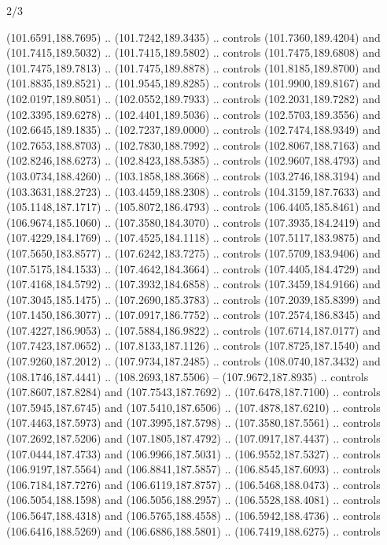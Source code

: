 \begin{flagdescription}{2/3}
\begin{scope}[shift={(0.5\flaglength,0.5)},scale=\flagwidth/320]
\begin{scope}[y=0.8pt, x=0.8pt, yscale=-1,shift={(-118.3,-146)}]
  (101.6591,188.7695) .. (101.7242,189.3435) .. controls (101.7360,189.4204) and
  (101.7415,189.5032) .. (101.7415,189.5802) .. controls (101.7475,189.6808) and
  (101.7475,189.7813) .. (101.7475,189.8878) .. controls (101.8185,189.8700) and
  (101.8835,189.8521) .. (101.9545,189.8285) .. controls (101.9900,189.8167) and
  (102.0197,189.8051) .. (102.0552,189.7933) .. controls (102.2031,189.7282) and
  (102.3395,189.6278) .. (102.4401,189.5036) .. controls (102.5703,189.3556) and
  (102.6645,189.1835) .. (102.7237,189.0000) .. controls (102.7474,188.9349) and
  (102.7653,188.8703) .. (102.7830,188.7992) .. controls (102.8067,188.7163) and
  (102.8246,188.6273) .. (102.8423,188.5385) .. controls (102.9607,188.4793) and
  (103.0734,188.4260) .. (103.1858,188.3668) .. controls (103.2746,188.3194) and
  (103.3631,188.2723) .. (103.4459,188.2308) .. controls (104.3159,187.7633) and
  (105.1148,187.1717) .. (105.8072,186.4793) .. controls (106.4405,185.8461) and
  (106.9674,185.1060) .. (107.3580,184.3070) .. controls (107.3935,184.2419) and
  (107.4229,184.1769) .. (107.4525,184.1118) .. controls (107.5117,183.9875) and
  (107.5650,183.8577) .. (107.6242,183.7275) .. controls (107.5709,183.9406) and
  (107.5175,184.1533) .. (107.4642,184.3664) .. controls (107.4405,184.4729) and
  (107.4168,184.5792) .. (107.3932,184.6858) .. controls (107.3459,184.9166) and
  (107.3045,185.1475) .. (107.2690,185.3783) .. controls (107.2039,185.8399) and
  (107.1450,186.3077) .. (107.0917,186.7752) .. controls (107.2574,186.8345) and
  (107.4227,186.9053) .. (107.5884,186.9822) .. controls (107.6714,187.0177) and
  (107.7423,187.0652) .. (107.8133,187.1126) .. controls (107.8725,187.1540) and
  (107.9260,187.2012) .. (107.9734,187.2485) .. controls (108.0740,187.3432) and
  (108.1746,187.4441) .. (108.2693,187.5506) -- (107.9672,187.8935) .. controls
  (107.8607,187.8284) and (107.7543,187.7692) .. (107.6478,187.7100) .. controls
  (107.5945,187.6745) and (107.5410,187.6506) .. (107.4878,187.6210) .. controls
  (107.4463,187.5973) and (107.3995,187.5798) .. (107.3580,187.5561) .. controls
  (107.2692,187.5206) and (107.1805,187.4792) .. (107.0917,187.4437) .. controls
  (107.0444,187.4733) and (106.9966,187.5031) .. (106.9552,187.5327) .. controls
  (106.9197,187.5564) and (106.8841,187.5857) .. (106.8545,187.6093) .. controls
  (106.7184,187.7276) and (106.6119,187.8757) .. (106.5468,188.0473) .. controls
  (106.5054,188.1598) and (106.5056,188.2957) .. (106.5528,188.4081) .. controls
  (106.5647,188.4318) and (106.5765,188.4558) .. (106.5942,188.4736) .. controls
  (106.6416,188.5269) and (106.6886,188.5801) .. (106.7419,188.6275) .. controls

\end{scope}
\end{scope}
\end{flagdescription}
